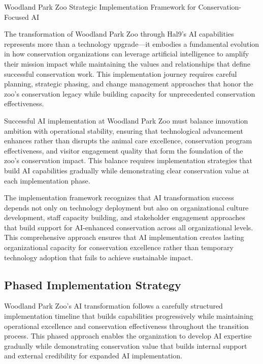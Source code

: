 \documentclass[
  Letterpaper,
]{scrbook}
\begin{document}
Woodland Park Zoo Strategic Implementation Framework for
Conservation-Focused AI

\hfill\break

The transformation of Woodland Park Zoo through Hal9's AI capabilities
represents more than a technology upgrade---it embodies a fundamental
evolution in how conservation organizations can leverage artificial
intelligence to amplify their mission impact while maintaining the
values and relationships that define successful conservation work. This
implementation journey requires careful planning, strategic phasing, and
change management approaches that honor the zoo's conservation legacy
while building capacity for unprecedented conservation effectiveness.

Successful AI implementation at Woodland Park Zoo must balance
innovation ambition with operational stability, ensuring that
technological advancement enhances rather than disrupts the animal care
excellence, conservation program effectiveness, and visitor engagement
quality that form the foundation of the zoo's conservation impact. This
balance requires implementation strategies that build AI capabilities
gradually while demonstrating clear conservation value at each
implementation phase.

The implementation framework recognizes that AI transformation success
depends not only on technology deployment but also on organizational
culture development, staff capacity building, and stakeholder engagement
approaches that build support for AI-enhanced conservation across all
organizational levels. This comprehensive approach ensures that AI
implementation creates lasting organizational capacity for conservation
excellence rather than temporary technology adoption that fails to
achieve sustainable impact.

\subsection{Phased Implementation
Strategy}\label{phased-implementation-strategy}

Woodland Park Zoo's AI transformation follows a carefully structured
implementation timeline that builds capabilities progressively while
maintaining operational excellence and conservation effectiveness
throughout the transition process. This phased approach enables the
organization to develop AI expertise gradually while demonstrating
conservation value that builds internal support and external credibility
for expanded AI implementation.
\end{document}
